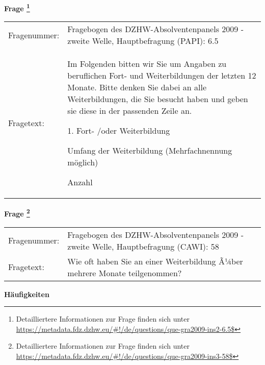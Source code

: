 				\vspace*{0.5cm}
                \noindent\textbf{Frage
	                \footnote{Detailliertere Informationen zur Frage finden sich unter
		              \url{https://metadata.fdz.dzhw.eu/\#!/de/questions/que-gra2009-ins2-6.5$}}}\\
				\begin{tabularx}{\hsize}{@{}lX}
					Fragenummer: &
					  Fragebogen des DZHW-Absolventenpanels 2009 - zweite Welle, Hauptbefragung (PAPI):
					  6.5
 \\
					Fragetext: & Im Folgenden bitten wir Sie um Angaben zu beruflichen Fort- und Weiterbildungen der letzten 12 Monate. Bitte denken Sie dabei an alle Weiterbildungen, die Sie besucht haben und geben sie diese in der passenden Zeile an.\par  1. Fort- /oder Weiterbildung\par  Umfang der Weiterbildung (Mehrfachnennung möglich)\par  Anzahl \\
				\end{tabularx}
				\vspace*{0.5cm}
                \noindent\textbf{Frage
	                \footnote{Detailliertere Informationen zur Frage finden sich unter
		              \url{https://metadata.fdz.dzhw.eu/\#!/de/questions/que-gra2009-ins3-58$}}}\\
				\begin{tabularx}{\hsize}{@{}lX}
					Fragenummer: &
					  Fragebogen des DZHW-Absolventenpanels 2009 - zweite Welle, Hauptbefragung (CAWI):
					  58
 \\
					Fragetext: & Wie oft haben Sie an einer Weiterbildung Ã¼ber mehrere Monate teilgenommen? \\
				\end{tabularx}





        		\vspace*{0.5cm}
                \noindent\textbf{Häufigkeiten}

